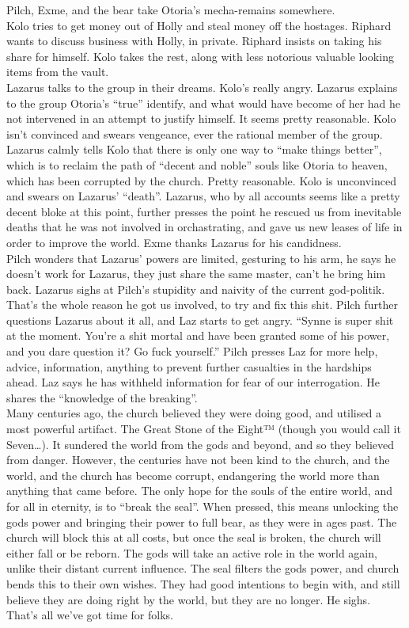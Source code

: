 Pilch, Exme, and the bear take Otoria’s mecha-remains somewhere.\\
Kolo tries to get money out of Holly and steal money off the hostages. Riphard wants to discuss business with Holly, in private. Riphard insists on taking his share for himself. Kolo takes the rest, along with less notorious valuable looking items from the vault.\\
Lazarus talks to the group in their dreams. Kolo’s really angry. Lazarus explains to the group Otoria’s “true” identify, and what would have become of her had he not intervened in an attempt to justify himself. It seems pretty reasonable. Kolo isn’t convinced and swears vengeance, ever the rational member of the group. Lazarus calmly tells Kolo that there is only one way to “make things better”, which is to reclaim the path of “decent and noble” souls like Otoria to heaven, which has been corrupted by the church. Pretty reasonable. Kolo is unconvinced and swears on Lazarus’ “death”. Lazarus, who by all accounts seems like a pretty decent bloke at this point, further presses the point he rescued us from inevitable deaths that he was not involved in orchastrating, and gave us new leases of life in order to improve the world. Exme thanks Lazarus for his candidness.\\
Pilch wonders that Lazarus’ powers are limited, gesturing to his arm, he says he doesn’t work for Lazarus, they just share the same master, can’t he bring him back. Lazarus sighs at Pilch’s stupidity and naivity of the current god-politik. That’s the whole reason he got us involved, to try and fix this shit. Pilch further questions Lazarus about it all, and Laz starts to get angry. “Synne is super shit at the moment. You’re a shit mortal and have been granted some of his power, and you dare question it? Go fuck yourself.” Pilch presses Laz for more help, advice, information, anything to prevent further casualties in the hardships ahead. Laz says he has withheld information for fear of our interrogation. He shares the “knowledge of the breaking”.\\
Many centuries ago, the church believed they were doing good, and utilised a most powerful artifact. The Great Stone of the Eight™ (though you would call it Seven…). It sundered the world from the gods and beyond, and so they believed from danger. However, the centuries have not been kind to the church, and the world, and the church has become corrupt, endangering the world more than anything that came before. The only hope for the souls of the entire world, and for all in eternity, is to “break the seal”. When pressed, this means unlocking the gods power and bringing their power to full bear, as they were in ages past. The church will block this at all costs, but once the seal is broken, the church will either fall or be reborn. The gods will take an active role in the world again, unlike their distant current influence. The seal filters the gods power, and church bends this to their own wishes. They had good intentions to begin with, and still believe they are doing right by the world, but they are no longer. He sighs. That’s all we’ve got time for folks.\\
